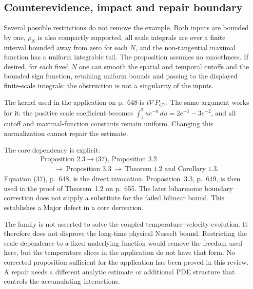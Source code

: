 \documentclass[10pt]{article}
\begin{document}
\subsection*{Counterevidence, impact and repair boundary}
Several possible restrictions do not remove the example. Both inputs are bounded by one, \(\rho_N\) is also compactly supported, all scale integrals are over a finite interval bounded away from zero for each \(N\), and the non-tangential maximal function has a uniform integrable tail. The proposition assumes no smoothness. If desired, for each fixed \(N\) one can smooth the spatial and temporal cutoffs and the bounded sign function, retaining uniform bounds and passing to the displayed finite-scale integrals; the obstruction is not a singularity of the inputs.\par
The kernel used in the application on p. 648 is \(t\nabla P_{t/2}\). The same argument works for it: the positive scale coefficient becomes \(\int_1^2u e^{-u}\,du=2e^{-1}-3e^{-2}\), and all cutoff and maximal-function constants remain uniform. Changing this normalization cannot repair the estimate.\par
The core dependency is explicit: \[\begin{aligned}
 &\text{Proposition 2.3}\ \longrightarrow\
 \text{(37), Proposition 3.2}\\
 &\hspace{2em}\longrightarrow\
 \text{Proposition 3.3}\ \longrightarrow\
 \text{Theorem 1.2 and Corollary 1.3}.
\end{aligned}\] Equation (37), p. 648, is the direct invocation. Proposition 3.3, p. 649, is then used in the proof of Theorem 1.2 on p. 655. The later biharmonic boundary correction does not supply a substitute for the failed bilinear bound. This establishes a Major defect in a core derivation.\par
The family is not asserted to solve the coupled temperature–velocity evolution. It therefore does not disprove the long-time physical Nusselt bound. Restricting the scale dependence to a fixed underlying function would remove the freedom used here, but the temperature slices in the application do not have that form. No corrected proposition sufficient for the application has been proved in this review. A repair needs a different analytic estimate or additional PDE structure that controls the accumulating interactions.\par
\end{document}
